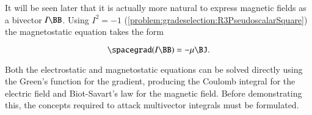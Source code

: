 {It will be seen later that it is actually more natural to express magnetic fields as a bivector \( I \BB \).  Using \( I^2 = -1 \) (\cref{problem:gradeselection:R3PseudoscalarSquare}) the magnetostatic equation takes the form

\begin{dmath}\label{eqn:vectorproduct:240}
\spacegrad (I \BB) = - \mu \BJ.
\end{dmath}

Both the electrostatic and magnetostatic equations can be solved directly using the Green's function for the gradient, producing the Coulomb integral for the electric field and Biot-Savart's law for the magnetic field.
Before demonstrating this, the concepts required to attack multivector integrals must be formulated.
} %
